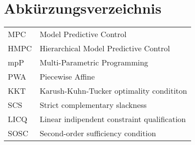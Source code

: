 
\begingroup 
\let\clearpage\relax
\let\cleardoublepage\relax
\let\cleardoublepage\relax

\chapter*{Abkürzungsverzeichnis}
\thispagestyle{empty}
\vspace{-.5em} %
\begin{tabular}{@{} p{\figurelabelwidth} @{} p{\textwidth-\figurelabelwidth}}
MPC & Model Predictive Control\\
HMPC & Hierarchical Model Predictive Control\\
mpP & Multi-Parametric Programming\\
PWA & Piecewise Affine\\
KKT & Karush-Kuhn-Tucker optimality condititon\\
SCS & Strict complementary slackness\\
LICQ & Linear indipendent constraint qualification\\
SOSC & Second-order sufficiency condition
\end{tabular}       
\endgroup
\cleardoublepage